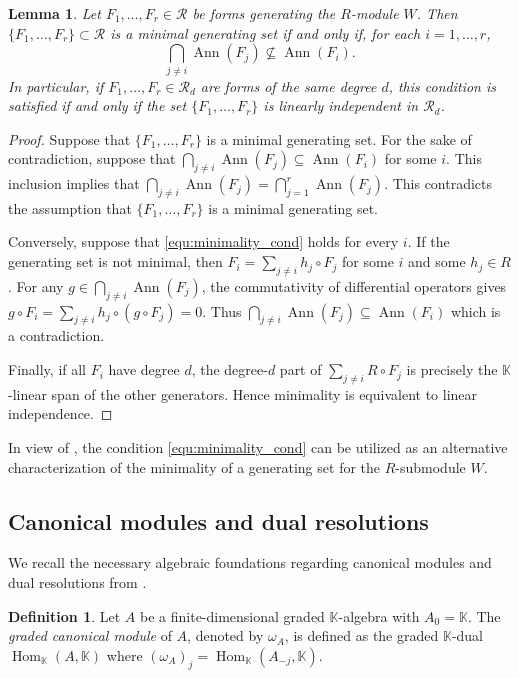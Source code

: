 \documentclass[a4paper, 11pt]{amsart}
\numberwithin{theorem}{section}
\newtheorem{lemma}[theorem]{Lemma}
\theoremstyle{definition}
\newtheorem{definition}[theorem]{Definition}
\numberwithin{equation}{section}
\DeclareMathOperator{\Ann}{\operatorname{Ann}}
\begin{document}
\begin{lemma}\label{lem:minimality_cond}
Let $F_1,\dots,F_r \in \mathcal{R}$ be forms generating the $R$-module $W$.
Then $\{F_1, \dots, F_r\} \subset \mathcal{R}$ is a minimal generating set if and only if, for each $i = 1, \dots, r$,
\begin{equation}\label{equ:minimality_cond}
    \bigcap_{j \neq i} \Ann(F_j) \nsubseteq \Ann(F_i).
\end{equation}
In particular, if $F_1, \dots, F_r \in \mathcal{R}_d$ are forms of the same degree $d$, this condition is satisfied if and only if the set $\{F_1, \dots, F_r\}$ is linearly independent in $\mathcal{R}_d$.
\end{lemma}
\begin{proof}
Suppose that $\{F_1, \dots, F_r\}$ is a minimal generating set.
For the sake of contradiction, suppose that $\bigcap_{j \neq i} \Ann(F_j) \subseteq \Ann(F_i)$ for some $i$. 
This inclusion implies that $\bigcap_{j \neq i} \Ann(F_j) = \bigcap_{j=1}^r \Ann(F_j)$. This contradicts the assumption that $\{F_1, \dots, F_r\}$ is a minimal generating set.

Conversely, suppose that \eqref{equ:minimality_cond} holds for every $i$.
If the generating set is not minimal, then $F_i = \sum_{j \neq i} h_j \circ F_j$ for some $i$ and some $h_j \in R$.
For any $g \in \bigcap_{j \neq i} \Ann(F_j)$, the commutativity of differential operators gives $g \circ F_i = \sum_{j \neq i} h_j \circ (g \circ F_j) = 0$.
Thus $\bigcap_{j \neq i} \Ann(F_j) \subseteq \Ann(F_i)$ which is a contradiction.

Finally, if all $F_i$ have degree $d$, the degree-$d$ part of $\sum_{j \neq i} R \circ F_j$ is precisely the $\mathbb{K}$-linear span of the other generators.
Hence minimality is equivalent to linear independence.
\end{proof}

In view of , the condition \eqref{equ:minimality_cond} can be utilized as an alternative characterization of the minimality of a generating set for the $R$-submodule $W$.

\subsection{Canonical modules and dual resolutions}\label{subsec:canonical_modules}
We recall the necessary algebraic foundations regarding canonical modules and dual resolutions from \cite{MR1322960}.

\begin{definition}
Let $A$ be a finite-dimensional graded $\mathbb{K}$-algebra with $A_0=\mathbb{K}$.
The \emph{graded canonical module} of $A$, denoted by $\omega_A$, is defined as the graded $\mathbb{K}$-dual $\operatorname{Hom}_{\mathbb{K}}(A,\mathbb{K})$ where $(\omega_A)_j=\operatorname{Hom}_{\mathbb{K}}(A_{-j},\mathbb{K})$.
\end{definition}
\end{document}
